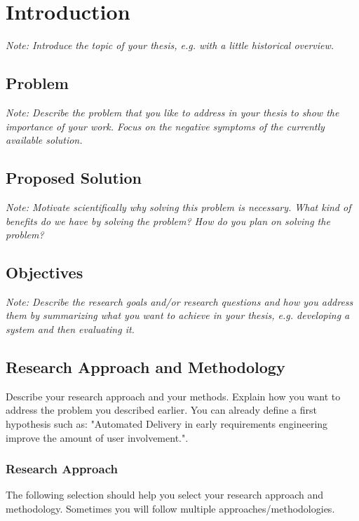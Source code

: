 \chapter{Introduction}

\textit{Note: Introduce the topic of your thesis, e.g. with a little historical overview.}

\section{Problem}

\textit{Note: Describe the problem that you like to address in your thesis to show the importance of your work. Focus on the negative symptoms of the currently available solution.}

\section{Proposed Solution}

\textit{Note: Motivate scientifically why solving this problem is necessary. What kind of benefits do we have by solving the problem? How do you plan on solving the problem?}

\section{Objectives}

\textit{Note: Describe the research goals and/or research questions and how you address them by summarizing what you want to achieve in your thesis, e.g. developing a system and then evaluating it.}

\section{Research Approach and Methodology}

Describe your research approach and your methods. Explain how you want to address the problem you described earlier. You can already define a first hypothesis such as: "Automated Delivery in early requirements engineering improve the amount of user involvement.".

\subsection{Research Approach} 

The following selection should help you select your research approach and methodology.
 Sometimes you will follow multiple approaches/methodologies.
 
